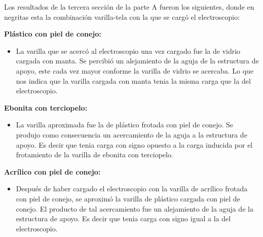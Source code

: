 \documentclass[letterpaper, 11 pt]{article}
\begin{document}
\begin{multicols*}{2}


Los resultados de la tercera sección de la parte A fueron los siguientes, donde en negritas esta la combinación varilla-tela con la que se cargó el electroscopio:

\textbf{Plástico con piel de conejo:}
\begin{itemize}[noitemsep]
    \item La varilla que se acercó al electroscopio una vez cargado fue la de vidrio cargada con manta. Se percibió un alejamiento de la aguja de la estructura de apoyo, este cada vez mayor conforme la varilla de vidrio se acercaba. Lo que nos indica que la varilla cargada con manta tenia la misma carga que la del electroscopio.
\end{itemize}

\textbf{Ebonita con terciopelo:}
\begin{itemize}[noitemsep]
    \item  La varilla aproximada fue la de plástico frotada con piel de conejo. Se produjo como consecuencia un acercamiento de la aguja a la estructura de apoyo. Es decir que tenia carga con signo opuesto a la carga inducida por el frotamiento de la varilla de ebonita con terciopelo.

\end{itemize}

\textbf{Acrílico con piel de conejo:}
\begin{itemize}[noitemsep]
    \item Después de haber cargado el electroscopio con la varilla de acrílico frotada con piel de conejo, se aproximó la varilla de plástico cargada con piel de conejo. El producto de tal acercamiento fue un alejamiento de la aguja de la estructura de apoyo. Es decir que tenia carga con signo igual a la del electroscopio. 

\end{itemize}


\end{multicols*}
\end{document}
